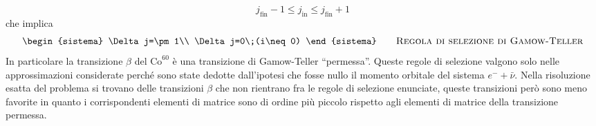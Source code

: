 \[
 j_{\text{fin}}-1\leq j_{\text{in}}\leq j_{\text{fin}}+1
\]
che implica
\[
\begin{sistema}
\Delta j=\pm1\\
\Delta j=0\;(i\neq0)
\end{sistema}\qquad\text{\textsc{Regola di selezione di Gamow-Teller}}
\]
In particolare la transizione $\beta$ del $\text{Co}^{60}$ è una transizione di
Gamow-Teller ``permessa''. Queste regole di selezione valgono solo nelle 
approssimazioni considerate
perché sono state dedotte dall'ipotesi che fosse nullo il momento orbitale del
sistema $e^-+\bar{\nu}$. Nella risoluzione esatta del problema si trovano delle 
transizioni $\beta$ che
non rientrano fra le regole di selezione enunciate, queste transizioni però 
sono
meno favorite in quanto i corrispondenti elementi di matrice sono di ordine più
piccolo rispetto
agli elementi di matrice della transizione permessa.

